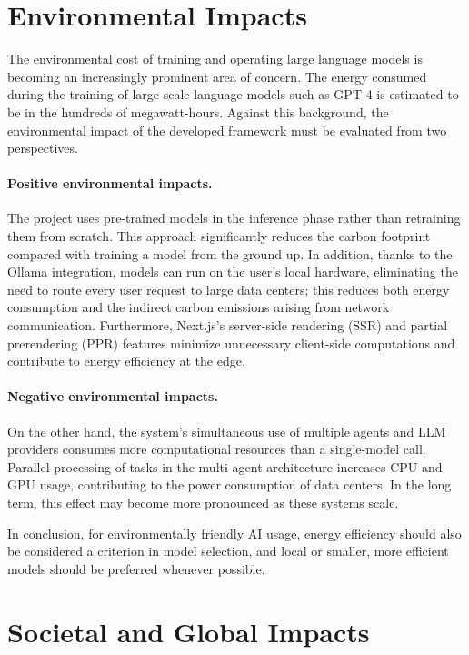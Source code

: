 \documentclass[11pt,a4paper]{report}
\begin{document}
\section{Environmental Impacts}

The environmental cost of training and operating large language models is
becoming an increasingly prominent area of concern. The energy consumed
during the training of large-scale language models such as GPT-4 is
estimated to be in the hundreds of megawatt-hours. Against this background,
the environmental impact of the developed framework must be evaluated from
two perspectives.

\paragraph{Positive environmental impacts.}
The project uses pre-trained models in the inference phase rather than
retraining them from scratch. This approach significantly reduces the carbon
footprint compared with training a model from the ground up. In addition,
thanks to the Ollama integration, models can run on the user's local
hardware, eliminating the need to route every user request to large data
centers; this reduces both energy consumption and the indirect carbon
emissions arising from network communication. Furthermore, Next.js's
server-side rendering (SSR) and partial prerendering (PPR) features minimize
unnecessary client-side computations and contribute to energy efficiency at
the edge.

\paragraph{Negative environmental impacts.}
On the other hand, the system's simultaneous use of multiple agents and LLM
providers consumes more computational resources than a single-model call.
Parallel processing of tasks in the multi-agent architecture increases CPU
and GPU usage, contributing to the power consumption of data centers. In the
long term, this effect may become more pronounced as these systems scale.

In conclusion, for environmentally friendly AI usage, energy efficiency
should also be considered a criterion in model selection, and local or
smaller, more efficient models should be preferred whenever possible.

\section{Societal and Global Impacts}
\end{document}
